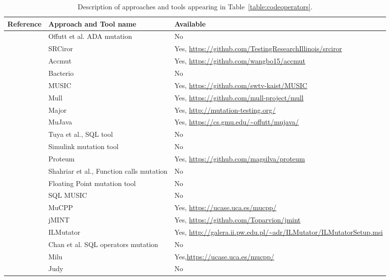 
\begin{table}[ht]
\tiny
\caption{Description of approaches and tools appearing in Table~\ref{table:codeoperators}.}
\begin{center}
\begin{tabular}{|p{1cm}|p{4cm}|p{8cm}|}
\hline
\textbf{Reference} & \textbf{Approach and Tool name} & \textbf{Available} \\
\hline
\cite{rothermel1996experimental} & Offutt et al. ADA mutation & No\\
\cite{hariri2018srciror} & SRCiror & Yes, \url{https://github.com/TestingResearchIllinois/srciror} \\
\cite{wang2017faster} & Accmut & Yes, \url{https://github.com/wangbo15/accmut}\\
\cite{mateo2012validating} & Bacterio & No \\

\cite{phan2018music} & MUSIC & Yes, \url{https://github.com/swtv-kaist/MUSIC} \\


\cite{denisov2018mull}	&  Mull & Yes, \url{https://github.com/mull-project/mull} \\

\cite{just2014major}	& Major & Yes, \url{http://mutation-testing.org/} \\
\cite{ma2006mujava} & MuJava & Yes, \url{https://cs.gmu.edu/~offutt/mujava/}\\
\cite{tuya2007mutating} & Tuya et al., SQL tool & No\\
\cite{binh2012mutation}	& Simulink mutation tool & No\\
\cite{delamaro2001interface} &	Proteum & Yes, \url{https://github.com/magsilva/proteum} \\
\cite{shahriar2008mutation} & Shahriar et al., Function calls mutation & No \\
\cite{dan2012semantic}	& Floating Point mutation tool & No \\
\cite{shahriar2008music} & SQL MUSIC & No \\
\cite{delgado2017assessment}	& MuCPP & Yes, \url{https://ucase.uca.es/mucpp/} \\
\cite{grechanik2016mutation}	& jMINT & Yes, \url{https://github.com/Toparvion/jmint} \\
\cite{derezinska2011object} & ILMutator & Yes, \url{http://galera.ii.pw.edu.pl/~adr/ILMutator/ILMutatorSetup.msi} \\
\cite{chan2005fault} & Chan et al. SQL operators mutation & No \\

\cite{jia2008milu} & Milu & Yes,\url{https://ucase.uca.es/mucpp/} \\
\cite{madeyski2010judy} & Judy & No \\
\hline
\end{tabular}
\end{center}
\label{table:codeMutation:references}
\end{table}%